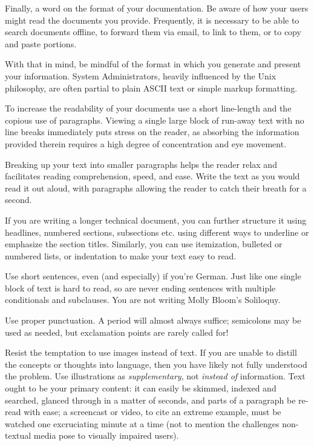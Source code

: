 Finally, a word on the format of your documentation.
Be aware of how your users might read the documents
you provide.  Frequently, it is necessary to be able
to search documents offline, to forward them via
email, to link to them, or to copy and paste
portions.

With that in mind, be mindful of the format in which
you generate and present your information.  System
Administrators, heavily influenced by the Unix
philosophy, are often partial
to plain ASCII text or simple markup formatting.

To increase the readability of your documents use a
short line-length and the copious use of paragraphs.
Viewing a single large block of run-away text with no
line breaks immediately puts stress on the reader, as
absorbing the information provided therein requires a
high degree of concentration and eye movement.

Breaking up your text into smaller paragraphs helps
the reader relax and facilitates reading
comprehension, speed, and ease.  Write the text as you
would read it out aloud, with paragraphs allowing the
reader to catch their breath for a second.

If you are writing a longer technical document, you
can further structure it using headlines, numbered
sections, subsections etc. using different ways to
underline or emphasize the section titles.  Similarly,
you can use itemization, bulleted or numbered lists,
or indentation to make your text easy to read.

Use short sentences, even (and especially) if you're
German.  Just like one single block of text is hard to
read, so are never ending sentences with multiple
conditionals and subclauses.  You are not writing
Molly Bloom's Soliloquy.

Use proper punctuation.  A period will almost always
suffice; semicolons may be used as needed, but
exclamation points are rarely called for!

Resist the temptation to use images instead of text.
If you are unable to distill the concepts or thoughts
into language, then you have likely not fully
understood the problem.  Use illustrations as {\em
supplementary}, not {\em instead of} information.
Text ought to be your primary content: it can
easily be skimmed, indexed and searched, glanced
through in a matter of seconds, and parts of a
paragraph be re-read with ease; a screencast or video,
to cite an extreme example, must be watched one
excruciating minute at a time (not to mention the
challenges non-textual media pose to visually impaired
users). \\

